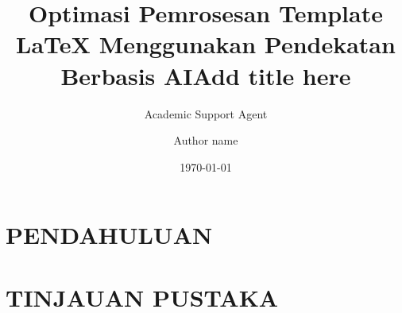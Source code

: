 \documentclass{article}
\title{Optimasi Pemrosesan Template LaTeX Menggunakan Pendekatan Berbasis AI}
\author{Academic Support Agent}
\date{\today}
\begin{document}
\maketitle

\begin{abstract}

\end{abstract}

\chapter{PENDAHULUAN}


\chapter{TINJAUAN PUSTAKA}



\usepackage[english]{babel}
\usepackage[utf8x]{inputenc}
\usepackage[T1]{fontenc}
\usepackage{aas_macros}

\usepackage[top=1.3cm, bottom=2.0cm, outer=2.5cm, inner=2.5cm, heightrounded,
marginparwidth=1.5cm, marginparsep=0.4cm, margin=2.5cm]{geometry}

\usepackage{graphicx} %
\usepackage[colorlinks=False]{hyperref} %
\usepackage{amsmath}  %
\usepackage{amsfonts} %
\usepackage{amssymb}  %

\usepackage[authoryear]{natbib}



\title{Add title here}
\author{Author name}
\end{document}
